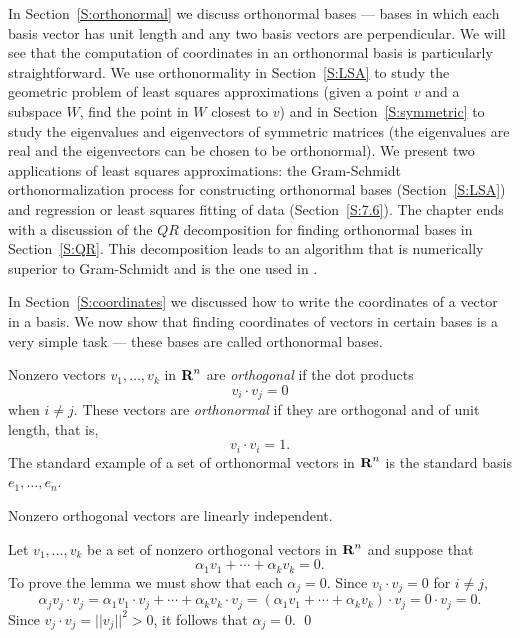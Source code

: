 \label{Chap:LinTrans}

\normalsize


In Section~\ref{S:orthonormal} we discuss orthonormal bases --- bases in
which each basis vector has unit length and any two basis vectors are 
perpendicular.
We will see that the computation of coordinates in an orthonormal basis is
particularly straightforward.  We
use orthonormality in Section~\ref{S:LSA} to study the geometric problem of
least squares approximations (given a point $v$ and a subspace $W$, find
the point in $W$ closest to $v$) and in Section~\ref{S:symmetric} to study
the eigenvalues and eigenvectors of symmetric matrices (the eigenvalues are
real and the eigenvectors can be chosen to be orthonormal).  We present two
applications of least squares approximations:  the  Gram-Schmidt
orthonormalization process for constructing orthonormal bases
(Section~\ref{S:LSA}) and regression or least squares fitting of data
(Section~\ref{S:7.6}).   The chapter ends with a discussion of the $QR$
decomposition for finding orthonormal bases in Section~\ref{S:QR}.  This
decomposition leads to an algorithm that is numerically superior to
Gram-Schmidt and is the one used in \Matlabp.


\label{S:orthonormal}

In Section~\ref{S:coordinates} we discussed how to write the coordinates of
a vector in a basis.  We now show that finding coordinates of vectors in
certain bases is a very simple task --- these bases are called orthonormal
bases.

Nonzero vectors $v_1,\ldots,v_k$ in $\mbox{$\bf{R}$}^n$ are
{\em orthogonal\/} if the
dot products
\[
v_i\cdot v_j  =  0
\]
when $i\neq j$.  These vectors are
{\em orthonormal\/} if they are
orthogonal and of unit length, that is,
\[
v_i\cdot v_i=1.
\]
The standard example of a set of orthonormal vectors in $\mbox{$\bf{R}$}^n$ is the
standard basis $e_1,\ldots,e_n$.

\begin{lemma} \label{L:orthog}
Nonzero orthogonal vectors are
linearly independent.
\end{lemma}

\proof  Let $v_1,\ldots,v_k$ be a set of nonzero orthogonal vectors in $\mbox{$\bf{R}$}^n$
and suppose that
\[
\alpha_1v_1 + \cdots + \alpha_kv_k = 0.
\]
To prove the lemma we must show that each $\alpha_j=0$.  Since
$v_i\cdot v_j = 0$ for $i\not= j$,
\[
\alpha_jv_j\cdot v_j = \alpha_1v_1\cdot v_j + \cdots + \alpha_kv_k\cdot v_j =
(\alpha_1v_1 + \cdots +\alpha_kv_k)\cdot v_j = 0\cdot v_j = 0.
\]
Since $v_j\cdot v_j = ||v_j||^2> 0$, it follows that $\alpha_j=0$.  \qed

